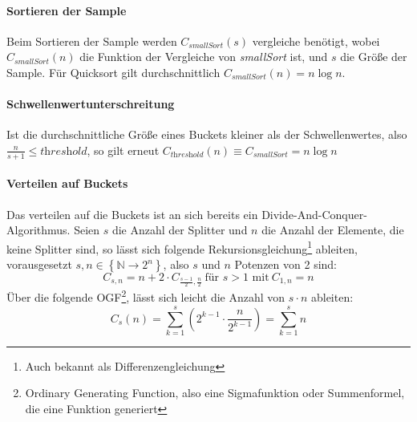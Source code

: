 		\paragraph{Sortieren der Sample}
			Beim Sortieren der Sample werden $C_\textit{smallSort}(s)$ vergleiche benötigt, wobei $C_\textit{smallSort}(n)$ die Funktion der Vergleiche von \textit{smallSort} ist, und $s$ die Größe der Sample.
			Für Quicksort gilt durchschnittlich $C_\textit{smallSort}(n)=n\log{n}$. \autocite{wikipedia-contributors-2022A}
			
		\paragraph{Schwellenwertunterschreitung}
			Ist die durchschnittliche Größe eines Buckets kleiner als der Schwellenwertes, also $\frac{n}{s+1}\leq \textit{threshold}$, so gilt erneut $C_\textit{threshold}(n)\equiv C_\textit{smallSort}=n\log{n}$
		
		\paragraph{Verteilen auf Buckets}
			Das verteilen auf die Buckets ist an sich bereits ein Divide-And-Conquer-Algorithmus.
			Seien $s$ die Anzahl der Splitter und $n$ die Anzahl der Elemente, die keine Splitter sind, so lässt sich folgende Rekursionsgleichung\footnote{Auch bekannt als Differenzengleichung} ableiten, vorausgesetzt $s,n\in \left\{ \mathbb{N}\to 2^n \right\}$, also $s$ und $n$ Potenzen von 2 sind:
			\begin{equation}
				C_{s,n}=n+2\cdot C_{\frac{s-1}{2}, \frac{n}{2}}\ \text{für $s>1$ mit}\ C_{1,n}=n
			\end{equation}
			Über die folgende OGF\footnote{Ordinary Generating Function, also eine Sigmafunktion oder Summenformel, die eine Funktion generiert}, lässt sich leicht die Anzahl von $s\cdot n$ ableiten:
			\begin{equation}
				C_s(n)=\sum_{k=1}^{s}\left(2^{k-1}\cdot \frac{n}{2^{k-1}}\right)=\sum_{k=1}^{s}n
			\end{equation}
